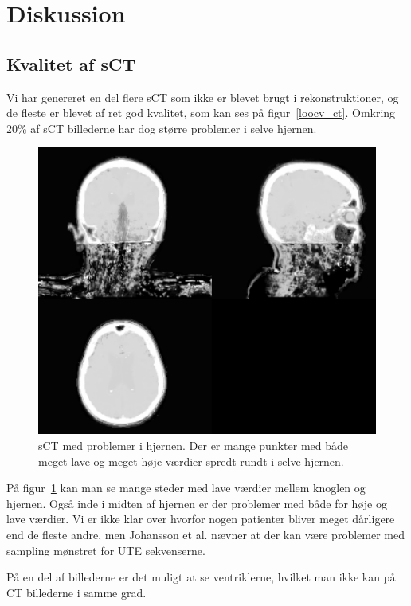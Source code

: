 \section{Diskussion}

\subsection{Kvalitet af sCT}


Vi har genereret en del flere sCT som ikke er blevet brugt i rekonstruktioner,  og de fleste er blevet af ret god kvalitet, som kan ses på figur~\ref{loocv_ct}. Omkring 20\% af sCT billederne har dog større problemer i selve hjernen.

\begin{figure}
   \includegraphics[width=\textwidth]{billeder/sct_problemer.png}
   \caption{sCT med problemer i hjernen. Der er mange punkter med både meget lave og meget høje værdier spredt rundt i selve hjernen.}
   \label{sct_problemer}
\end{figure}

På figur~\ref{sct_problemer} kan man se mange steder med lave værdier mellem knoglen og hjernen. Også inde i midten af hjernen er der problemer med både for høje og lave værdier. Vi er ikke klar over hvorfor nogen patienter bliver meget dårligere end de fleste andre, men Johansson et al. nævner at der kan være problemer med sampling mønstret for UTE sekvenserne.

På en del af billederne er det muligt at se ventriklerne, hvilket man ikke kan på CT billederne i samme grad.

